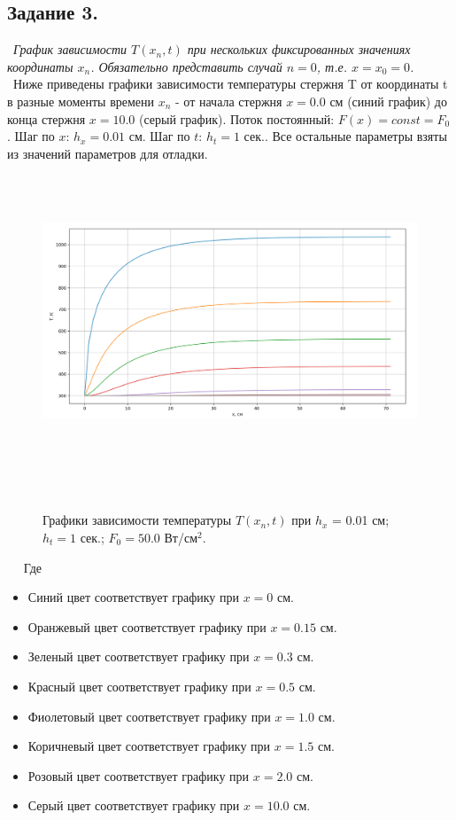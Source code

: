 \documentclass[a4paper,12pt]{article}
\begin{document}
	\subsection*{Задание 3.}
	
	 \textit{График зависимости $T(x_n, t)$ при нескольких фиксированных значениях координаты $x_n$. Обязательно представить случай $n = 0$, т.е. $x = x_0 = 0$.}
	 
	 Ниже приведены графики зависимости температуры стержня T от координаты t в разные моменты времени $x_n$ - от начала стержня $x = 0.0$ см (синий график) до конца стержня $x = 10.0$ (серый график). Поток постоянный: $F(x) = const = F_0$. Шаг по $x$: $h_x = 0.01$ см. Шаг по $t$: $h_t = 1$ сек.. Все остальные параметры взяты из значений параметров для отладки.
	 
	 \begin{figure}[h!]
	 	\begin{center}
	 		{\includegraphics[scale = 0.4]{8.png}}
	 		\label{ris:8}
	 	\end{center}
	 	\caption{Графики зависимости температуры $T(x_n, t)$ при $h_x$ = 0.01 см; $h_t = 1$ сек.; $F_0 = 50.0$ Вт/см$^2$.}
	 \end{figure}
	 
	 \linebreak Где 
	 \begin{itemize}
		\item Синий цвет соответствует графику при $x = 0$ см.
		\item Оранжевый цвет соответствует графику при $x = 0.15$ см.
		\item Зеленый цвет соответствует графику при $x = 0.3$ см.
		\item Красный цвет соответствует графику при $x = 0.5$ см.
		\item Фиолетовый цвет соответствует графику при $x = 1.0$ см.
		\item Коричневый цвет соответствует графику при $x = 1.5$ см.
		\item Розовый цвет соответствует графику при $x = 2.0$ см.
		\item Серый цвет соответствует графику при $x = 10.0$ см.
	 \end{itemize}
\end{document}
